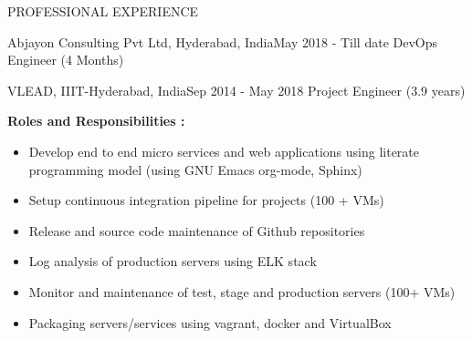 \documentclass{resume} %
\begin{document}
\begin{rSection}{PROFESSIONAL EXPERIENCE}
  
  \begin{rSubsection}
    {Abjayon Consulting Pvt Ltd, Hyderabad, India}{May 2018 - Till date}
    {DevOps Engineer} {(4 Months)}

  \begin{rSubsection}
    {VLEAD, IIIT-Hyderabad, India}{Sep 2014 - May 2018}
    {Project Engineer} {(3.9 years)}

    \textbf{Roles and Responsibilities :}

    \begin{itemize}
      
    \item Develop end to end micro services and web
      applications using literate programming model (using
      GNU Emacs org-mode, Sphinx)

    \item Setup continuous integration pipeline for projects
      (100 + VMs)

    \item Release and source code maintenance of Github
      repositories

    \item Log analysis of production servers using ELK stack      
      
    \item Monitor and maintenance of test, stage and production
      servers (100+ VMs)
      
    \item Packaging servers/services using vagrant,
      docker and VirtualBox


\end{itemize}
\end{rSubsection}
\end{rSubsection}
\end{rSection}
\end{document}
